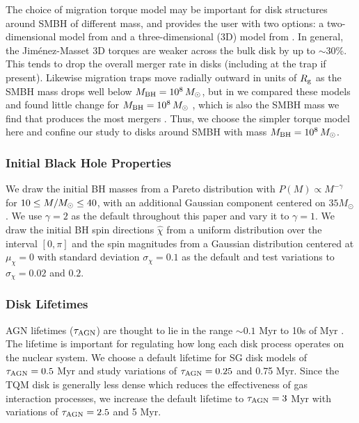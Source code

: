 The choice of migration torque model may be important for disk structures around SMBH of different mass, and \mcfacts provides the user with two options: a two-dimensional model from \citet{Paardekooper+10} and a three-dimensional (3D) model from \citet{JimenezMassset17}.
In general, the Jim\'enez-Masset 3D torques are weaker across the bulk disk by up to $\sim$30\%.
This tends to drop the overall merger rate in disks (including at the trap if present).
Likewise migration traps move radially outward in units of $R_{\rm g}$ as the SMBH mass drops well below $M_{\rm BH}=10^8\,M_{\odot}$, but in \citet{McKernan+25-mcfactsI} we compared these models and found little change for $M_{\rm BH} = 10^8\,M_{\odot}$ \citep[see Fig. 6 \& 7 of][]{McKernan+25-mcfactsI}, which is also the SMBH mass we find that produces the most mergers \citep{Delfavero+25-mcfactsIII}.
Thus, we choose the simpler \citet{Paardekooper+10} torque model here and confine our study to disks around SMBH with mass $M_{\rm BH} = 10^8\,M_{\odot}$.

\subsubsection{Initial Black Hole Properties}
We draw the initial BH masses from a Pareto distribution with $P(M) \propto M^{-\gamma}$ for $10\leq M/M_{\odot} \leq40$, with an additional Gaussian component centered on $35M_{\odot}$ \citep[see][]{McKernan+25-mcfactsI}.
We use $\gamma=2$ as the default throughout this paper and vary it to $\gamma=1$.
We draw the initial BH spin directions $\hat{\chi}$ from a uniform distribution over the interval $[0,\pi]$ and the spin magnitudes from a Gaussian distribution centered at $\mu_\chi=0$ with standard deviation $\sigma_{\chi} = 0.1$ as the default and test variations to $\sigma_{\chi}=0.02$ and $0.2$.

\subsubsection{Disk Lifetimes}
AGN lifetimes ($\tau_{\rm AGN}$) are thought to lie in the range $\sim 0.1$ Myr \citep{Schawinski+15,Khrykin+19} to 10s of Myr \citep{Hopkins+05,Khrykin+21}.
The lifetime is important for regulating how long each disk process operates on the nuclear system.
We choose a default lifetime for SG disk models of $\tau_{\rm AGN}=0.5$ Myr and study variations of $\tau_{\rm AGN} = 0.25$ and 0.75 Myr.
Since the TQM disk is generally less dense which reduces the effectiveness of gas interaction processes, we increase the default lifetime to $\tau_{\rm AGN} = 3$ Myr with variations of $\tau_{\rm AGN} = 2.5$ and 5 Myr.

